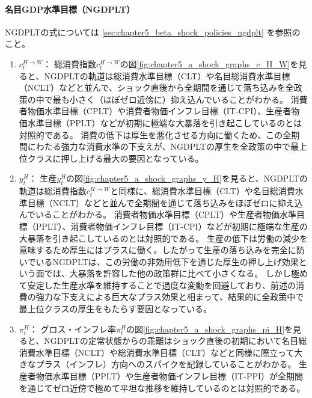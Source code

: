 \paragraph{名目GDP水準目標（NGDPLT）}
\label{sec:chapter5_a_shock_policies_ngdplt}
NGDPLTの式については
\ref{sec:chapter5_beta_shock_policies_ngdplt}
を参照のこと。
\begin{enumerate}
    \item
    \label{itm:chapter5_a_shock_policies_ngdplt_c_H_W}
        \(c_t^{H\to W}\)：
        総消費指数\(c_t^{H\to W}\)の図\ref{fig:chapter5_a_shock_graphs_c_H_W}を見ると、NGDPLTの軌道は総消費水準目標（CLT）や名目総消費水準目標（NCLT）などと並んで、ショック直後から全期間を通じて落ち込みを全政策の中で最も小さく（ほぼゼロ近傍に）抑え込んでいることがわかる。
        消費者物価水準目標（CPLT）や消費者物価インフレ目標（IT-CPI）、生産者物価水準目標（PPLT）などが初期に極端な大暴落を引き起こしているのとは対照的である。
        消費の低下は厚生を悪化させる方向に働くため、この全期間にわたる強力な消費水準の下支えが、NGDPLTの厚生を全政策の中で最上位クラスに押し上げる最大の要因となっている。
    \item
    \label{itm:chapter5_a_shock_policies_ngdplt_y_H}
        \(y_t^H\)：
        生産\(y_t^H\)の図\ref{fig:chapter5_a_shock_graphs_y_H}を見ると、NGDPLTの軌道は総消費指数\(c_t^{H\to W}\)と同様に、総消費水準目標（CLT）や名目総消費水準目標（NCLT）などと並んで全期間を通じて落ち込みをほぼゼロに抑え込んでいることがわかる。
        消費者物価水準目標（CPLT）や生産者物価水準目標（PPLT）、消費者物価インフレ目標（IT-CPI）などが初期に極端な生産の大暴落を引き起こしているのとは対照的である。
        生産の低下は労働の減少を意味するため厚生にはプラスに働く。したがって生産の落ち込みを完全に防いでいるNGDPLTは、この労働の非効用低下を通じた厚生の押し上げ効果という面では、大暴落を許容した他の政策群に比べて小さくなる。
        しかし極めて安定した生産水準を維持することで過度な変動を回避しており、前述の消費の強力な下支えによる巨大なプラス効果と相まって、結果的に全政策中で最上位クラスの厚生をもたらす要因となっている。
    \item
    \label{itm:chapter5_a_shock_policies_ngdplt_pi_H}
        \(\pi_t^H\)：
        グロス・インフレ率\(\pi_t^H\)の図\ref{fig:chapter5_a_shock_graphs_pi_H}を見ると、NGDPLTの定常状態からの乖離はショック直後の初期において名目総消費水準目標（NCLT）や総消費水準目標（CLT）などと同様に際立って大きなプラス（インフレ）方向へのスパイクを記録していることがわかる。
        生産者物価水準目標（PPLT）や生産者物価インフレ目標（IT-PPI）が全期間を通じてゼロ近傍で極めて平坦な推移を維持しているのとは対照的である。

\end{enumerate}
